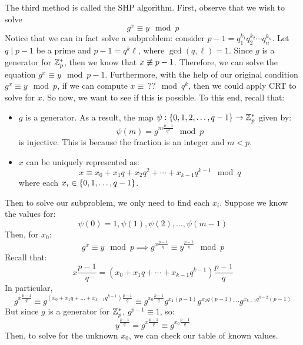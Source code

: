 \documentclass{article}
\begin{document}
The third method is called the SHP algorithm. First, observe that we wish to solve
\begin{equation*}
    g^{x} \equiv y \mod p
\end{equation*}
Notice that we can in fact solve a subproblem:
consider $ p - 1 = q_{1}^{k_{1}}q_{2}^{k_{2}}\cdots q_{n}^{k_{n}} $.
Let $ q \mid p - 1 $ be a prime and $ p-1 = q^{k}\ell $, where $ \gcd(q, \ell) = 1 $.
Since $ g $ is a generator for $ \mathbb{Z}_{p}^{*} $, then we know that $ x \cnot\equiv p - 1 $.
Therefore, we can solve the equation $ g^{x} \equiv y \mod p - 1 $. \vsp
%
Furthermore, with the help of our original condition $ g^{x} \equiv y \mod p $,
if we can compute $ x \equiv \ ?? \mod q^{k} $, then we could apply CRT to solve for $ x $.
So now, we want to see if this is possible.\vsp
%
To this end, recall that:
\begin{itemize}
    \item $ g $ is a generator. As a result, the map
        $ \psi : \left\{{0, 1, 2, \dots, q - 1}\right\} \rightarrow \mathbb{Z}_{p}^{*} $ given by:
        \begin{equation*}
            \psi(m) = g^{m\frac{p-1}{q^{k}}} \mod p
        \end{equation*}
        is injective. This is because the fraction is an integer and $ m < p $.
    \item $ x $ can be uniquely represented as:
        \begin{equation*}
            x \equiv x_{0} + x_{1}q + x_{2}q^{2} + \cdots + x_{k-1}q^{k-1} \mod q
        \end{equation*}
        where each $ x_{i} \in \left\{{0, 1, \dots, q - 1}\right\} $.
\end{itemize}
Then to solve our subproblem, we only need to find each $ x_{i} $. \vsp
%
Suppose we know the values for:
\begin{equation*}
    \psi(0) = 1, \psi(1), \psi(2), \dots, \psi(m - 1)
\end{equation*}
Then, for $ x_{0} $:
\begin{equation*}
    g^{x} \equiv y \mod p \implies g^{x\frac{p-1}{q}} \equiv y^{\frac{p-1}{q}} \mod p
\end{equation*}
Recall that:
\begin{equation*}
    x\frac{p-1}{q} = (x_{0} + x_{1}q + \cdots + x_{k-1}q^{k-1})\frac{p-1}{q}
\end{equation*}
In particular,
\begin{equation*}
    g^{x\frac{p-1}{q}} \equiv g^{(x_{0} + x_{1}q + \dots + x_{k-1}q^{k-1})\frac{p-1}{q}}
    \equiv g^{x_{0}\frac{p-1}{q}}g^{x_{1}(p-1)}g^{x_{2}q(p-1)}\cdots g^{x_{k-1}q^{k-2}(p-1)}
\end{equation*}
But since $ g $ is a generator for $ \mathbb{Z}_{p}^{*} $, $ g^{p-1} \equiv 1 $, so:
\begin{equation*}
    y^{\frac{p-1}{q}} = g^{x\frac{p-1}{q}} \equiv g^{x_{0}\frac{p - 1}{q}}
\end{equation*}
Then, to solve for the unknown $ x_{0} $, we can check our table of known values.
\end{document}
